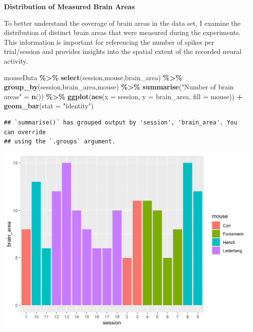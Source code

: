 \documentclass[
]{article}
\newenvironment{Shaded}{\begin{snugshade}}{\end{snugshade}}
\newcommand{\AttributeTok}[1]{\textcolor[rgb]{0.13,0.29,0.53}{#1}}
\newcommand{\FunctionTok}[1]{\textcolor[rgb]{0.13,0.29,0.53}{\textbf{#1}}}
\newcommand{\NormalTok}[1]{#1}
\newcommand{\OtherTok}[1]{\textcolor[rgb]{0.56,0.35,0.01}{#1}}
\newcommand{\SpecialCharTok}[1]{\textcolor[rgb]{0.81,0.36,0.00}{\textbf{#1}}}
\newcommand{\StringTok}[1]{\textcolor[rgb]{0.31,0.60,0.02}{#1}}
\begin{document}
\textbf{Distribution of Measured Brain Areas}

To better understand the coverage of brain areas in the data set, I
examine the distribution of distinct brain areas that were measured
during the experiments. This information is important for referencing
the number of spikes per trial/session and provides insights into the
spatial extent of the recorded neural activity.

\begin{Shaded}
\begin{Highlighting}[]
\NormalTok{mouseData }\SpecialCharTok{\%\textgreater{}\%} \FunctionTok{select}\NormalTok{(session,mouse,brain\_area) }\SpecialCharTok{\%\textgreater{}\%} \FunctionTok{group\_by}\NormalTok{(session,brain\_area,mouse) }\SpecialCharTok{\%\textgreater{}\%} \FunctionTok{summarise}\NormalTok{(}\StringTok{"Number of brain areas"} \OtherTok{=} \FunctionTok{n}\NormalTok{()) }\SpecialCharTok{\%\textgreater{}\%} \FunctionTok{ggplot}\NormalTok{(}\FunctionTok{aes}\NormalTok{(}\AttributeTok{x =}\NormalTok{ session, }\AttributeTok{y =}\NormalTok{ brain\_area, }\AttributeTok{fill =}\NormalTok{ mouse)) }\SpecialCharTok{+} \FunctionTok{geom\_bar}\NormalTok{(}\AttributeTok{stat =} \StringTok{"identity"}\NormalTok{)}
\end{Highlighting}
\end{Shaded}

\begin{verbatim}
## `summarise()` has grouped output by 'session', 'brain_area'. You can override
## using the `.groups` argument.
\end{verbatim}

\includegraphics{images/unnamed-chunk-3-1.png}
\end{document}
